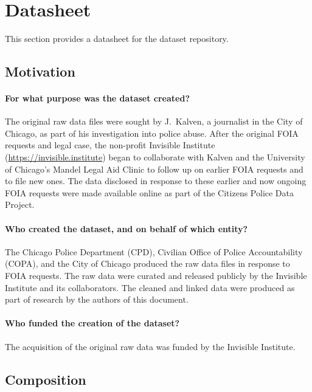 \section{Datasheet}

This section provides a datasheet \cite{Gebru18} for the dataset repository.

\subsection{Motivation}

\paragraph{For what purpose was the dataset created?}
The original raw data files were sought by J.~Kalven, a journalist in the City
of Chicago, as part of his investigation into police abuse. After the original
FOIA requests and legal case, the non-profit Invisible Institute (\url{https://invisible.institute}) 
began to collaborate with Kalven and the University of Chicago's Mandel Legal Aid Clinic
to follow up on earlier FOIA requests and to file new ones. The data disclosed
in response to these earlier and now ongoing FOIA requests were made available
online as part of the Citizens Police Data Project.

\paragraph{Who created the dataset, and on behalf of which entity?}
The Chicago Police Department (CPD), Civilian Office of Police Accountability
(COPA), and the City of Chicago produced the raw data files in response to FOIA
requests. The raw data were curated and released publicly by the Invisible
Institute and its collaborators. The cleaned and linked data were produced
as part of research by the authors of this document.

\paragraph{Who funded the creation of the dataset?}
The acquisition of the original raw data was funded by the Invisible Institute.

\subsection{Composition}

